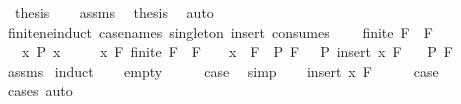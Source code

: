 \begin{isabellebody}
\ {\isachardoublequoteopen}{\isasymnot}\ {\isacharquery}{\kern0pt}thesis{\isachardoublequoteclose}\isanewline
\ \ \isamarkupfalse%
\ assms\ \isamarkupfalse%
\ {\isacharquery}{\kern0pt}thesis\ \isamarkupfalse%
\ auto\isanewline
{}\isamarkupfalse%
%
\endisatagproof
{\isafoldproof}%
%
\isadelimproof
%
\endisadelimproof
%
\isadelimdocument
%
\endisadelimdocument
%
\isatagdocument
%
\isamarkuptrue%
%
\endisatagdocument
{\isafolddocument}%
%
\isadelimdocument
%
\endisadelimdocument
{}\isamarkupfalse%
\ finite{\isacharunderscore}{\kern0pt}ne{\isacharunderscore}{\kern0pt}induct\ {\isacharbrackleft}{\kern0pt}case{\isacharunderscore}{\kern0pt}names\ singleton\ insert{\isacharcomma}{\kern0pt}\ consumes\ {}{\isacharbrackright}{\kern0pt}{\isacharcolon}{\kern0pt}\isanewline
\ \ \ {\isachardoublequoteopen}finite\ F{\isachardoublequoteclose}\ \ {\isachardoublequoteopen}F\ {\isasymnoteq}\ {\isacharbraceleft}{\kern0pt}{\isacharbraceright}{\kern0pt}{\isachardoublequoteclose}\isanewline
\ \ \ {\isachardoublequoteopen}{\isasymAnd}x{\isachardot}{\kern0pt}\ P\ {\isacharbraceleft}{\kern0pt}x{\isacharbraceright}{\kern0pt}{\isachardoublequoteclose}\isanewline
\ \ \ \ \ {\isachardoublequoteopen}{\isasymAnd}x\ F{\isachardot}{\kern0pt}\ finite\ F\ {\isasymLongrightarrow}\ F\ {\isasymnoteq}\ {\isacharbraceleft}{\kern0pt}{\isacharbraceright}{\kern0pt}\ {\isasymLongrightarrow}\ x\ {\isasymnotin}\ F\ {\isasymLongrightarrow}\ P\ F\ \ {\isasymLongrightarrow}\ P\ {\isacharparenleft}{\kern0pt}insert\ x\ F{\isacharparenright}{\kern0pt}{\isachardoublequoteclose}\isanewline
\ \ \ {\isachardoublequoteopen}P\ F{\isachardoublequoteclose}\isanewline
%
\isadelimproof
\ \ %
\endisadelimproof
%
\isatagproof
{}\isamarkupfalse%
\ assms\isanewline
{}\isamarkupfalse%
\ induct\isanewline
\ \ \isamarkupfalse%
\ empty\isanewline
\ \ \isamarkupfalse%
\ \isamarkupfalse%
\ {\isacharquery}{\kern0pt}case\ \isamarkupfalse%
\ simp\isanewline
{}\isamarkupfalse%
\isanewline
\ \ \isamarkupfalse%
\ {\isacharparenleft}{\kern0pt}insert\ x\ F{\isacharparenright}{\kern0pt}\isanewline
\ \ \isamarkupfalse%
\ \isamarkupfalse%
\ {\isacharquery}{\kern0pt}case\ \isamarkupfalse%
\ cases\ auto\isanewline
{}\isamarkupfalse%

\end{isabellebody}
